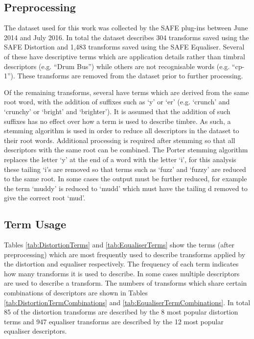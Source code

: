 	\subsection{Preprocessing}
	\label{sec:TimbreEvaluation-Analysis-Preprocessing}
		The dataset used for this work was collected by the SAFE plug-ins between June 2014 and July 2016. In total
		the dataset describes 304 transforms saved using the SAFE Distortion and 1,483 transforms saved using the
		SAFE Equaliser. Several of these have descriptive terms which are application details rather than timbral
		descriptors (e.g. ``Drum Bus'') while others are not recognisable words (e.g.  ``cp-1''). These transforms
		are removed from the dataset prior to further processing.

		Of the remaining transforms, several have terms which are derived from the same root word, with the
		addition of suffixes such as `y' or `er' (e.g. `crunch' and `crunchy' or `bright' and `brighter'). It is
		assumed that the addition of such suffixes has no effect over how a term is used to describe timbre. As
		such, a stemming algorithm \citep{porter1980an} is used in order to reduce all descriptors in the dataset
		to their root words.  Additional processing is required after stemming so that all descriptors with the
		same root can be combined.  The Porter stemming algorithm replaces the letter `y' at the end of a word with
		the letter `i', for this analysis these tailing `i's are removed so that terms such as `fuzz' and `fuzzy'
		are reduced to the same root. In some cases the output must be further reduced, for example the term
		`muddy' is reduced to `mudd' which must have the tailing d removed to give the correct root `mud'.

	\subsection{Term Usage}
	\label{sec:TimbreEvaluation-Analysis-TermUsage}
		Tables \ref{tab:DistortionTerms} and \ref{tab:EqualiserTerms} show the terms (after preprocessing) which
		are most frequently used to describe transforms applied by the distortion and equaliser respectively. The
		frequency of each term indicates how many transforms it is used to describe. In some cases multiple
		descriptors are used to describe a transform. The numbers of transforms which share certain combinations of
		descriptors are shown in Tables \ref{tab:DistortionTermCombinations} and
		\ref{tab:EqualiserTermCombinations}. In total 85 of the distortion transforms are described by the 8 most
		popular distortion terms and 947 equaliser transforms are described by the 12 most popular equaliser
		descriptors.

